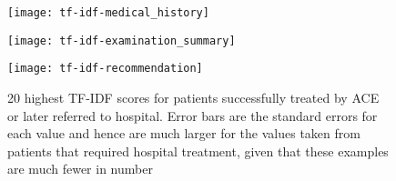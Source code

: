\begin{figure}[H]
    \centering
    \texttt{[image: tf-idf-medical\_history]}
\end{figure}

\begin{figure}[H]
    \centering
    \texttt{[image: tf-idf-examination\_summary]}
\end{figure}

\begin{figure}[H]
    \centering
    \texttt{[image: tf-idf-recommendation]}
    \caption[Occurance of TF-IDF scores]{20 highest TF-IDF scores for patients successfully treated by ACE or later referred to hospital. Error bars are the standard errors for each value and hence are much larger for the values taken from patients that required hospital treatment, given that these examples are much fewer in number}
    \label{fig:tf-idf-scores}
\end{figure}

\clearpage
